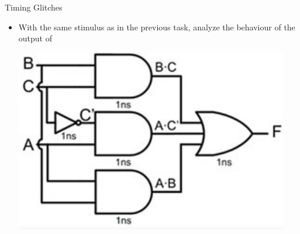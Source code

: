 \begin{task}{Timing Glitches}{}{}
\begin{itemize}
{    Explain all changes to signals at times.}

  \item{With the same stimulus as in the previous task, analyze the behaviour of the output of

    \includegraphics[width=.5\textwidth]{gfx/circuit_timingglitch_corrected.png}

  }
    

    \end{itemize}
  

\end{task}
